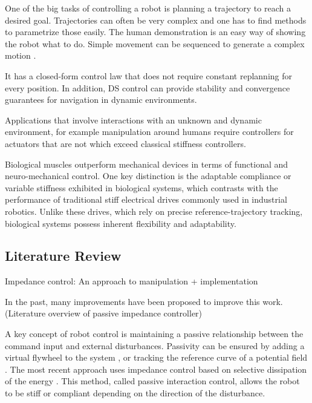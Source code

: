 \documentclass[conference]{IEEEtran}
\begin{document}
One of the big tasks of controlling a robot is planning a trajectory to reach a desired goal. Trajectories can often be very complex and one has to find methods to parametrize those easily. The human demonstration is an easy way of showing the robot what to do. Simple movement can be sequenced to generate a complex motion \cite{gribovskaya2011motion}.

It has a closed-form control law that does not require constant replanning for every position. In addition, DS control can provide stability and convergence guarantees for navigation in dynamic environments.

Applications that involve interactions with an unknown and dynamic environment, for example manipulation around humans require controllers for actuators that are not which exceed classical stiffness controllers.

Biological muscles outperform mechanical devices in terms of functional and neuro-mechanical control. One key distinction is the adaptable compliance or variable stiffness exhibited in biological systems, which contrasts with the performance of traditional stiff electrical drives commonly used in industrial robotics. Unlike these drives, which rely on precise reference-trajectory tracking, biological systems possess inherent flexibility and adaptability.


\subsection{Literature Review}

Impedance control: An approach to manipulation + implementation
\cite{hogan1984impedance, hogan1985impedance}

In the past, many improvements have been proposed to improve this work.
\cite{vanderborght2013variable} (Literature overview of passive impedance controller)

A key concept of robot control is maintaining a passive relationship between the command input and external disturbances. Passivity can be ensured by adding a virtual flywheel to the system \cite{li1999passive, kishi2003passive}, or tracking the reference curve of a potential field \cite{duindam2004passive}. The most recent approach uses impedance control based on selective dissipation of the energy \cite{kronander2015passive}. This method, called passive interaction control, allows the robot to be stiff or compliant depending on the direction of the disturbance.
\end{document}
